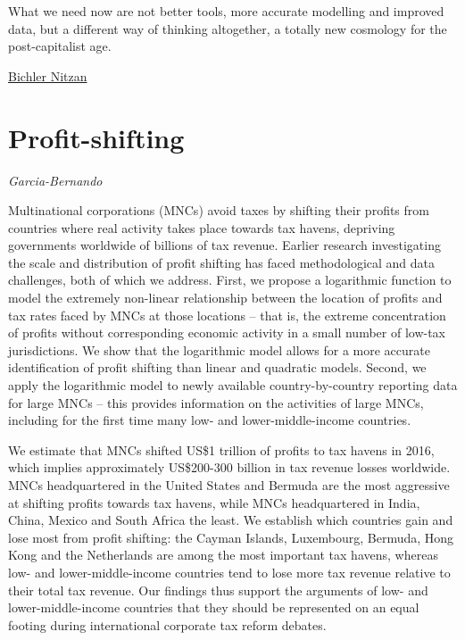 \documentclass[
]{book}
\begin{document}
What we need now are not better tools, more accurate modelling and improved data, but a different way of thinking altogether, a totally new cosmology for the post-capitalist age.

\href{https://evonomics.com/what-do-economists-mean-when-they-talk-about-capital-accumulation/}{Bichler Nitzan}

\hypertarget{profit-shifting}{%
\section{Profit-shifting}\label{profit-shifting}}

\emph{Garcia-Bernando}

Multinational corporations (MNCs) avoid taxes by shifting their profits from countries where real activity takes place towards tax havens, depriving governments worldwide of billions of tax revenue. Earlier research investigating the scale and distribution of profit shifting has faced methodological and data challenges, both of which we address. First, we propose a logarithmic function to model the extremely non-linear relationship between the location of profits and tax rates faced by MNCs at those locations -- that is, the extreme concentration of profits without corresponding economic activity in a small number of low-tax jurisdictions. We show that the logarithmic model allows for a more accurate identification of profit shifting than linear and quadratic models. Second, we apply the logarithmic model to newly available country-by-country reporting data for large MNCs -- this provides information on the activities of large MNCs, including for the first time many low- and lower-middle-income countries.

We estimate that MNCs shifted US\$1 trillion of profits to tax havens in 2016, which implies approximately US\$200-300 billion in tax revenue losses worldwide. MNCs headquartered in the United States and Bermuda are the most aggressive at shifting profits towards tax havens, while MNCs headquartered in India, China, Mexico and South Africa the least. We establish which countries gain and lose most from profit shifting: the Cayman Islands, Luxembourg, Bermuda, Hong Kong and the Netherlands are among the most important tax havens, whereas low- and lower-middle-income countries tend to lose more tax revenue relative to their total tax revenue. Our findings thus support the arguments of low- and lower-middle-income countries that they should be represented on an equal footing during international corporate tax reform debates.
\end{document}
